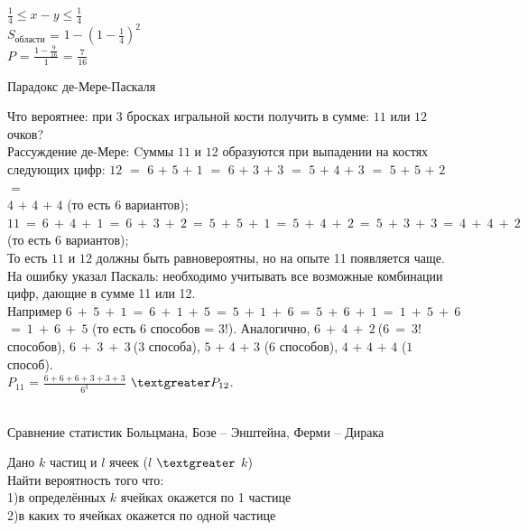 \documentclass[russian, 12pt, fleqn]{article}
\begin{document}
$\frac{1}{4} \leq x - y \leq \frac{1}{4}$\\	
$S_{области}$ = $1 - {(1 - \frac{1}{4})}^2$\\
$P$ = $\frac{1 - \frac{9}{16}}{1}$ = $\frac{7}{16}$
\begin{center}
$\textbf{Парадокс де-Мере-Паскаля }$
\end{center}
Что вероятнее: при $3$ бросках игральной кости получить в сумме: $11$ или $12$ очков?\\
Рассуждение де-Мере: Cуммы $11$ и $12$ образуются при выпадении на костях следующих цифр: $12$ $=$ $6$ $+$  $5$ $+$ $1$ $=$ $6$ $+$ $3$ $+$ $3$ $=$ $5$ $+$ $4$ $+$ $3$ $=$ $5$ $+$ $5$ $+$ $2$ $=$ \\
$4$ $+$ $4$ $+$ $4$ (то есть $6$ вариантов);\\
$11\ =\  6\ +\ 4\ +\ 1\ =\ 6\ +\ 3\ +\ 2\ =\ 5\ +\ 5\ +\ 1\ =\ 5\ +\ 4\ +\ 2\ =\ 5\ +\ 3\ +\ 3\ =\ 4\ +\ 4\ +\ 2\ $(то есть $6$ вариантов);\\
То есть $11$ и $12$ должны быть равновероятны, но на опыте 11 появляется чаще.\\
На ошибку указал Паскаль: необходимо учитывать все возможные комбинации цифр, дающие в сумме 11 или 12.\\
Например $6\ +\ 5\ +\ 1\ =\ 6\ +\ 1\ +\ 5\ =\ 5\ +\ 1\ +\ 6\ =\ 5\ +\  6\ +\ 1\ =\ 1\ +\ 5\ +\ 6$\\
$=\ 1\ +\ 6\ +\ 5$ (то есть $6$ способов = $3$!). Аналогично, $6\ +\ 4\ +\ 2\  $($6\ =\ 3!$ способов), $6\ +\ 3\ +\  3\ $($3$ способа), $5$ $+$ $4$ $+$ $3$ ($6$ способов), $4$ $+$ $4$ $+$ $4$ ($1$ способ).\\
$P_{11}$ = $\frac{6 +  6 + 6 + 3 + 3 + 3}{6^3}$  $\textgreater P_{12}$.\\
\\
\begin{center}
$\textbf{Сравнение статистик Больцмана, Бозе -- Энштейна, Ферми -- Дирака }$
\end{center}
Дано $k$ частиц и $l$ ячеек ($l$ $\textgreater$ $k$)\\
Найти вероятность того что:\\
	1)в определённых $k$ ячейках окажется по 1 частице\\
	2)в каких то ячейках окажется по одной частице\\
\end{document}

